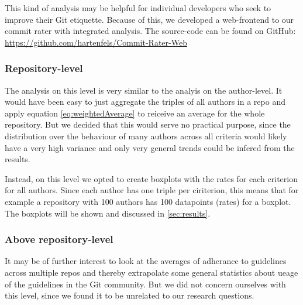 This kind of analysis may be helpful for individual developers who seek to improve their Git etiquette. Because of this, we developed a web-frontend to our commit rater with integrated analysis. The source-code can be found on GitHub: \url{https://github.com/hartenfels/Commit-Rater-Web}


\subsubsection{Repository-level}
The analysis on this level is very similar to the analyis on the author-level. It would have been easy to just aggregate the triples of all authors in a repo and apply equation \ref{eq:weightedAverage} to reiceive an average for the whole repository. But we decided that this would serve no practical purpose, since the distribution over the behaviour of many authors across all criteria would likely have a very high variance and only very general trends could be infered from the results.

Instead, on this level we opted to create boxplots with the rates for each criterion for all authors. Since each author has one triple per ciriterion, this means that for example a repository with 100 authors has 100 datapoints (rates) for a boxplot. The boxplots will be shown and discussed in \ref{sec:results}.

\subsubsection{Above repository-level}
It may be of further interest to look at the averages of adherance to guidelines across multiple repos and thereby extrapolate some general statistics about ueage of the guidelines in the Git community. But we did not concern ourselves with this level, since we found it to be unrelated to our research questions.
